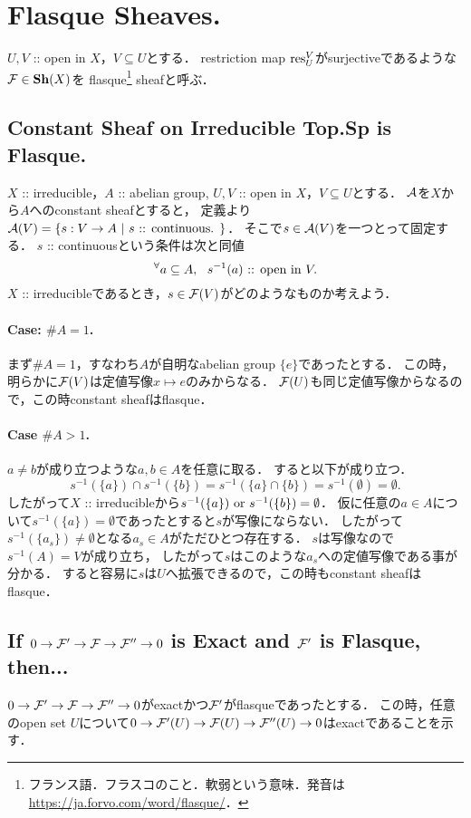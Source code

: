 \documentclass[a4paper]{jsarticle}
\newcommand{\Sh}{\mathbf{Sh}}
\begin{document}
\section{Flasque Sheaves.} %
    $U,V$ :: open in $X$，$V \subseteq U$とする．
    restriction map $\operatorname{res}_U^V$がsurjectiveであるような$\shF \in \Sh(X)$を
    flasque\footnote{フランス語．フラスコのこと．軟弱という意味．発音は \url{https://ja.forvo.com/word/flasque/}．} sheafと呼ぶ．

    \subsection{Constant Sheaf on Irreducible Top.Sp is Flasque.}
    $X$ :: irreducible，$A$ :: abelian group, $U,V$ :: open in $X$，$V \subseteq U$とする．
    $\mathcal{A}$を$X$から$A$へのconstant sheafとすると，
    定義より$\mathcal{A}(V)=\{ s: V \to A ~|~ s \text{ :: continuous. }\}$．
    そこで$s \in \mathcal{A}(V)$を一つとって固定する．
    $s$ :: continuousという条件は次と同値
    \[ {}^{\forall} a \subseteq A,~~ s^{-1}(a) \text{ :: open in } V. \]
    $X$ :: irreducibleであるとき，$s \in \mathcal{F}(V)$がどのようなものか考えよう．
    
    \paragraph{Case: $\#A=1$.}
    まず$\#A=1$，すなわち$A$が自明なabelian group $\{e\}$であったとする．
    この時，明らかに$\mathcal{F}(V)$は定値写像$x \mapsto e$のみからなる．
    $\mathcal{F}(U)$も同じ定値写像からなるので，この時constant sheafはflasque．

    \paragraph{Case $\#A>1$.}
    $a \neq b$が成り立つような$a,b \in A$を任意に取る．
    すると以下が成り立つ．
    \[ s^{-1}(\{a\}) \cap s^{-1}(\{b\})=s^{-1}(\{a\} \cap \{b\})=s^{-1}(\emptyset)=\emptyset. \]
    したがって$X$ :: irreducibleから$s^{-1}(\{a\}) \text{ or } s^{-1}(\{b\})=\emptyset$．
    仮に任意の$a \in A$について$s^{-1}(\{a\})=\emptyset$であったとすると$s$が写像にならない．
    したがって$s^{-1}(\{a_s\}) \neq \emptyset$となる$a_s \in A$がただひとつ存在する．
    $s$は写像なので$s^{-1}(A)=V$が成り立ち，
    したがって$s$はこのような$a_s$への定値写像である事が分かる．
    すると容易に$s$は$U$へ拡張できるので，この時もconstant sheafはflasque．

    \subsection{If $0 \to \mathcal{F}' \to \mathcal{F} \to \mathcal{F}'' \to 0$ is Exact and $\mathcal{F}'$ is Flasque, then... }
    $0 \to \mathcal{F}' \to \mathcal{F} \to \mathcal{F}'' \to 0$がexactかつ$\mathcal{F}'$がflasqueであったとする．
    この時，任意のopen set $U$について$0 \to \mathcal{F}'(U) \to \mathcal{F}(U) \to \mathcal{F}''(U) \to 0$はexactであることを示す．
\end{document}
